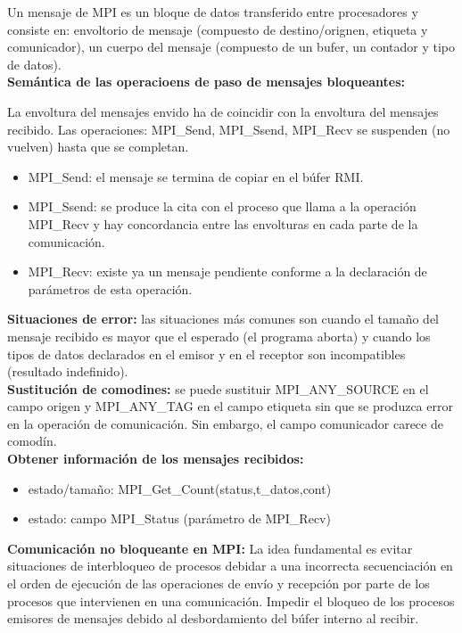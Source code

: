 \documentclass[a4paper,11pt]{article}
\begin{document}
Un mensaje de MPI es un bloque de datos transferido entre procesadores y consiste en: envoltorio de mensaje (compuesto de destino/orignen, etiqueta y comunicador), un cuerpo del mensaje (compuesto de un bufer, un contador y tipo de datos). \\

\textbf{Semántica de las operacioens de paso de mensajes bloqueantes:}

La envoltura del mensajes envido ha de coincidir con la envoltura del mensajes recibido. Las operaciones: MPI\_Send, MPI\_Ssend, MPI\_Recv se suspenden (no vuelven) hasta que se completan. \\

\begin{itemize}
\item MPI\_Send: el mensaje se termina de copiar en el búfer RMI.
\item MPI\_Ssend: se produce la cita con el proceso que llama a la operación MPI\_Recv y hay concordancia entre las envolturas en cada parte de la comunicación.
\item MPI\_Recv: existe ya un mensaje pendiente conforme a la declaración de parámetros de esta operación.
\end{itemize}

\textbf{Situaciones de error:} las situaciones más comunes son cuando el tamaño del mensaje recibido es mayor que el esperado (el programa aborta) y cuando los tipos de datos declarados en el emisor y en el receptor son incompatibles (resultado indefinido). \\

\textbf{Sustitución de comodines:} se puede sustituir MPI\_ANY\_SOURCE en el campo origen y MPI\_ANY\_TAG	en el campo etiqueta sin que se produzca error en la operación de comunicación. Sin embargo, el campo comunicador carece de comodín. \\

\textbf{Obtener información de los mensajes recibidos:}

\begin{itemize}
\item estado/tamaño: MPI\_Get\_Count(status,t\_datos,cont)
\item estado: campo MPI\_Status (parámetro de MPI\_Recv)
\end{itemize}

\textbf{Comunicación no bloqueante en MPI:}
La idea fundamental es evitar situaciones de interbloqueo de procesos debidar a una incorrecta secuenciación en el orden de ejecución de las operaciones de envío y recepción por parte de los procesos que intervienen en una comunicación. Impedir el bloqueo de los procesos emisores de mensajes debido al desbordamiento del búfer interno al recibir. \\
\end{document}
